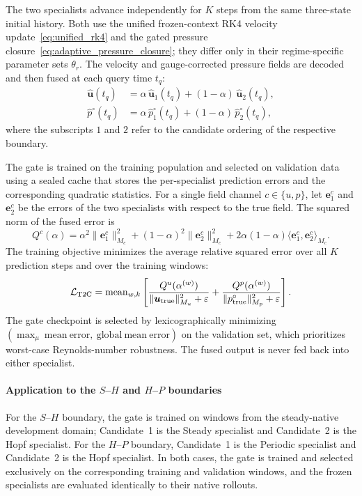 The two specialists advance independently for $K$ steps from the same
three-state initial history.  Both use the unified frozen-context RK4
velocity update~\eqref{eq:unified_rk4} and the gated pressure
closure~\eqref{eq:adaptive_pressure_closure}; they differ only in their
regime-specific parameter sets $\theta_r$.  The velocity and
gauge-corrected pressure fields are decoded and then fused at each query
time $t_q$:
\begin{align}
  \widehat{\boldsymbol{u}}(t_q)
  &=
  \alpha\,\widehat{\boldsymbol{u}}_{1}(t_q)
  + (1-\alpha)\,\widehat{\boldsymbol{u}}_{2}(t_q),
  \label{eq:field_fusion}\\
  \widehat{p}^{\circ}(t_q)
  &=
  \alpha\,\widehat{p}^{\circ}_{1}(t_q)
  + (1-\alpha)\,\widehat{p}^{\circ}_{2}(t_q),
  \label{eq:pressure_field_fusion}
\end{align}
where the subscripts $1$ and $2$ refer to the candidate ordering of the
respective boundary.

The gate is trained on the training population and selected on validation
data using a sealed cache that stores the per-specialist prediction errors
and the corresponding quadratic statistics.  For a single field channel
$c\in\{u,p\}$, let $\boldsymbol{e}_1^c$ and $\boldsymbol{e}_2^c$ be the
errors of the two specialists with respect to the true field.  The squared
norm of the fused error is
\begin{equation}
  Q^c(\alpha)
  =
  \alpha^2\|\boldsymbol{e}_1^c\|_{M_c}^{2}
  +(1-\alpha)^2\|\boldsymbol{e}_2^c\|_{M_c}^{2}
  +2\alpha(1-\alpha)
  \langle\boldsymbol{e}_1^c,\boldsymbol{e}_2^c\rangle_{M_c}.
  \label{eq:t2c_quadratic_error}
\end{equation}
The training objective minimizes the average relative squared error over
all $K$ prediction steps and over the training windows:
\begin{equation}
  \mathcal{L}_{\mathrm{T2C}}
  =
  \operatorname{mean}_{w,k}
  \left[
  \frac{Q^u(\alpha^{(w)})}
       {\|\boldsymbol{u}_{\rm true}\|_{M_u}^{2}+\varepsilon}
  +
  \frac{Q^p(\alpha^{(w)})}
       {\|p_{\rm true}^{\circ}\|_{M_p}^{2}+\varepsilon}
  \right].
  \label{eq:t2c_training_loss}
\end{equation}
The gate checkpoint is selected by lexicographically minimizing
$(\max_{\mu}\ \mathrm{mean\ error},\ \mathrm{global\ mean\ error})$ on the
validation set, which prioritizes worst-case Reynolds-number robustness.
The fused output is never fed back into either specialist.

\paragraph{Application to the $S$--$H$ and $H$--$P$ boundaries}
For the $S$--$H$ boundary, the gate is trained on windows from the
steady-native development domain; Candidate~1 is the Steady specialist and
Candidate~2 is the Hopf specialist.  For the $H$--$P$ boundary, Candidate~1
is the Periodic specialist and Candidate~2 is the Hopf specialist.  In both
cases, the gate is trained and selected exclusively on the corresponding
training and validation windows, and the frozen specialists are evaluated
identically to their native rollouts.

